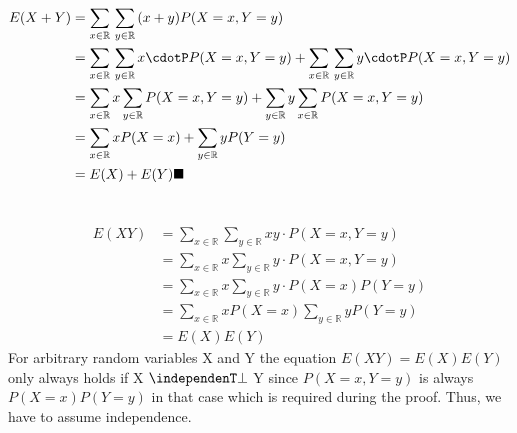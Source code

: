 \documentclass[12pt,a4paper]{article}
\newcommand\independent{\protect\mathpalette{\protect\independenT}{\perp}}
\begin{document}
\section{}
\begin{align}
E(X+Y) &= \sum_{x \in \mathbb{R}}{}\sum_{y \in \mathbb{R}}{(x+y)P(X=x, Y=y)} \\
&= \sum_{x \in \mathbb{R}}{}\sum_{y \in \mathbb{R}}{x \cdotP P(X=x, Y=y)} + \sum_{x \in \mathbb{R}}{}\sum_{y \in \mathbb{R}}{y \cdotP P(X=x, Y=y)} \\
&= \sum_{x \in \mathbb{R}}{x}\sum_{y \in \mathbb{R}}{P(X=x, Y=y)} + \sum_{y \in \mathbb{R}}{y}\sum_{x \in \mathbb{R}}{P(X=x, Y=y)} \\
&= \sum_{x \in \mathbb{R}}{x}{P(X=x)} + \sum_{y \in \mathbb{R}}{y}{P(Y=y)} \\
&= E(X) + E(Y) \blacksquare
\end{align}

\section{}
\begin{align}
E(XY) &= \sum_{x \in \mathbb{R}}{}\sum_{y \in \mathbb{R}}{xy \cdot P(X=x, Y=y)} \\
&= \sum_{x \in \mathbb{R}}{x}\sum_{y \in \mathbb{R}}{y \cdot P(X=x, Y=y)} \\
&= \sum_{x \in \mathbb{R}}{x}\sum_{y \in \mathbb{R}}{y \cdot P(X=x)P(Y=y)} \\
&= \sum_{x \in \mathbb{R}}{x}{P(X=x)}\sum_{y \in \mathbb{R}}{y}{P(Y=y)} \\
&= E(X)E(Y)
\end{align}
For arbitrary random variables X and Y the equation $E(XY) = E(X)E(Y)$ only always holds if X $\independent$ Y since $P(X=x, Y=y)$ is always $P(X=x)P(Y=y)$ in that case which is required during the proof. Thus, we have to assume independence. \blacksquare
\end{document}
